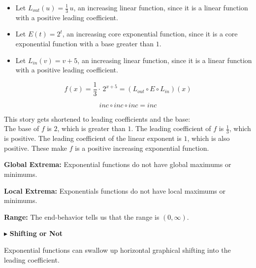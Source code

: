 \documentclass{ximera}
\begin{document}
\begin{example}
\begin{itemize}
\item Let $L_{out}(u) = \frac{1}{3} \, u$, an increasing linear function, since it is a linear function with a positive leading coefficient.
\item Let $E(t) = 2^t$, an increasing core exponential function, since it is a core exponential function with a base greater than $1$.
\item Let $L_{in}(v) = v + 5$, an increasing linear function, since it is a linear function with a positive leading coefficient.
\end{itemize}





\[  f(x) = \frac{1}{3} \cdot \, 2^{x+5} = (L_{out} \circ E \circ L_{in})(x)\]

\[ inc \circ inc \circ inc = inc  \]



This story gets shortened to leading coefficients and the base:\\
The base of $f$ is $2$, which is greater than $1$. The leading coefficient of $f$ is $\frac{1}{3}$, which is positive. The leading coefficient of the linear exponent is $1$, which is also positive.  These make $f$ is a positive increasing exponential function.



\textbf{Global Extrema:}  Exponential functions do not have global maximums or minimums. 


\textbf{Local Extrema:}  Exponentials functions do not have local maximums or minimums. 



\textbf{Range:} The end-behavior tells us that the range is $(0, \infty)$.





\end{example}

















$\blacktriangleright$ \textbf{\textcolor{blue!55!black}{Shifting or Not}} 



Exponential functions can swallow up horizontal graphical shifting into the leading coefficient.
\end{document}
